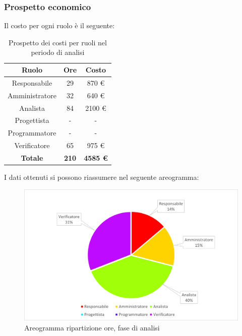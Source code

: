 \subsubsection{Prospetto economico}
Il costo per ogni ruolo è il seguente:
\begin{table}[H]
		\begin{center}
			\setlength{\aboverulesep}{0pt}
			\setlength{\belowrulesep}{0pt}
			\setlength{\extrarowheight}{.75ex}
			\begin{tabular}{ c c c }
				\rowcolor{AzzurroGruppo!30} 
				\textbf{Ruolo} & \textbf{Ore} & \textbf{Costo}  \\
				\toprule
				Responsabile & 29 & 870 \euro \\
				Amministratore & 32 & 640 \euro \\
				Analista & 84 & 2100 \euro \\
				Progettista & - & - \\
				Programmatore & - & - \\
				Verificatore & 65 & 975 \euro \\
				\textbf{Totale} & \textbf{210} & \textbf{4585 \euro} \\
				\bottomrule
			\end{tabular}
			\caption{ Prospetto dei costi per ruoli nel periodo di analisi}
		\end{center}
\end{table}
I dati ottenuti si possono riassumere nel seguente areogramma:
\begin{figure}[H]
    \centering
    \includegraphics[scale = 0.5]{components/img/analisi-torta.png}
    \caption{ Areogramma ripartizione ore, fase di analisi}
    \label{fig:Areogramma ripartizione ore, fase di analisi}
\end{figure}
